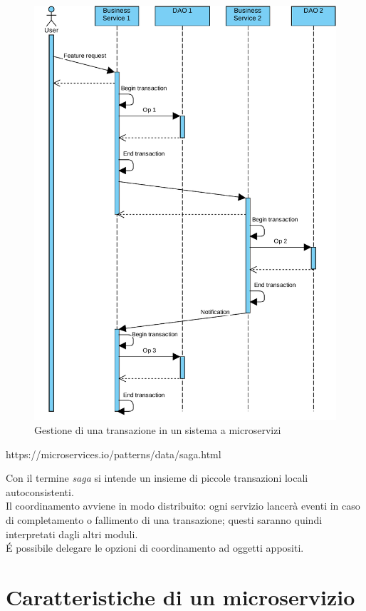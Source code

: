\begin{figure}[h]
	\centering
	\includegraphics[width=\textwidth]{img/microservices-transaction}
	\caption{Gestione di una transazione in un sistema a microservizi}
	\label{fig:micro-transaction}
\end{figure}

https://microservices.io/patterns/data/saga.html

Con il termine \textit{saga} si intende un insieme di piccole transazioni locali autoconsistenti.\\
Il coordinamento avviene in modo distribuito: ogni servizio lancerà eventi in caso di completamento o fallimento di una transazione; questi saranno quindi interpretati dagli altri moduli.\\
\'E possibile delegare le opzioni di coordinamento ad oggetti appositi.

\section{Caratteristiche di un microservizio}

